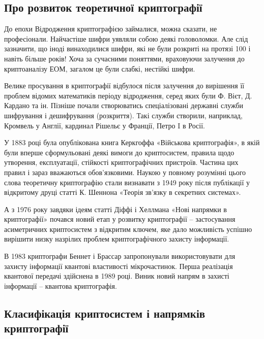 \subsection{Про розвиток теоретичної криптографії}

До епохи Відродження криптографією займалися, можна сказати, не
професіонали. Найчастіше шифри уявляли собою деякі головоломки. Але
слід зазначити, що іноді винаходилися шифри, які не були розкриті на
протязі 100 і навіть більше років! Хоча за сучасними поняттями,
враховуючи залучення до криптоаналізу ЕОМ, загалом це були слабкі,
нестійкі шифри.

Велике просування в криптографії відбулося після залучення до
вирішення її проблем відомих математиків періоду відродження, серед яких
були Ф. Вієт, Д. Кардано та ін. Пізніше почали створюватись спеціалізовані
державні служби шифрування і дешифрування (розкриття). Такі служби
створили, наприклад, Кромвель у Англії, кардинал Рішельє у Франції, Петро
I в Росії.

У 1883 році була опублікована книга Керкгоффа «Військова
криптографія», в якій були вперше сформульовані деякі вимоги до
криптосистем, правила щодо утворення, експлуатації, стійкості
криптографічних пристроїв. Частина цих правил і зараз вважаються
обов'язковими. Наукою у повному розумінні цього слова теоретичну
криптографію стали визнавати з 1949 року після публікації у відкритому
друці статті К. Шеннона «Теорія зв'язку в секретних системах».

А з 1976 року завдяки ідеям статті Діффі і Хеллмана «Нові напрямки в
криптографії» почався новий етап у розвитку криптографії – застосування
асиметричних криптосистем з відкритим ключем, яке дало можливість
успішно вирішити низку назрілих проблем криптографічного захисту
інформації.

В 1983 криптографи Беннет і Брассар запропонували використовувати
для захисту інформації квантові властивості мікрочастинок. Перша реалізація
квантової передачі здійснена в 1989 році. Виник новий напрям в захисті
інформації – квантова криптографія.

\subsection{Класифікація криптосистем і напрямків криптографії}

